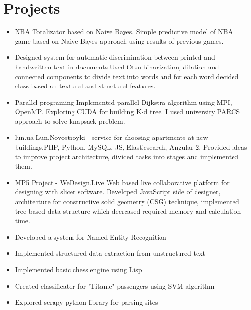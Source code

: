 \documentclass[letterpaper]{twentysecondcv} %
\begin{document}
\section{Projects}
\begin{itemize}
	\item \projectItem
        {NBA Totalizator based on Naive Bayes.}
        {Simple predictive model of NBA game based on Naive Bayes approach using results of previous games.}
    \item \projectItem
        {Designed system for automatic discrimination between printed and handwritten text in documents}
        {Used Otsu binarization, dilation and connected components to divide text into words and for each word decided class based on textural and structural features.}
	\item \projectItem
        {Parallel programing}
        {Implemented parallel Dijkstra algorithm using MPI, OpenMP. Exploring CUDA for building K-d tree. I used university PARCS approach to solve knapsack problem.}
	\item \projectItem
        {lun.ua}
        {Lun.Novostroyki - service for choosing apartments at new buildings.PHP, Python, MySQL, JS, Elasticsearch, Angular 2. Provided ideas to improve project architecture, divided tasks into stages and implemented them. }
    \item \projectItem
        {MP5 Project - WeDesign.Live}
        {Web based live collaborative platform for designing with slicer software. Developed JavaScript side of designer, architecture for constructive solid geometry (CSG) technique, implemented tree based data structure which decreased required memory and calculation time.}
	\item \projectItem
        {Developed a system for Named Entity Recognition}
        {}
	\item \projectItem
        {Implemented structured data extraction from unstructured text }
        {}
	\item \projectItem
        {Implemented basic chess engine using Lisp }
        {}
    \item \projectItem
        {Created classificator for "Titanic" passengers using SVM algorithm }
        {}
    \item \projectItem
        {Explored scrapy python library for parsing sites }

\end{itemize}
\end{document}
